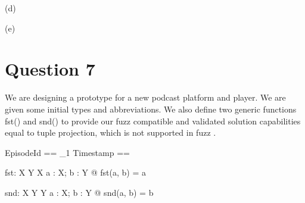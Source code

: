 \documentclass[a4paper,10pt,fleqn]{article}
\begin{document}
\medskip

\noindent\hspace*{\parindent}(d) 

\medskip

\noindent\hspace*{\parindent}(e) 


\bigskip

\setlength{\leftskip}{\dimexpr\parindent+2em\relax}
\newpage

\setlength{\leftskip}{0pt}
\section*{Question 7}

\noindent We are designing a prototype for a new podcast platform and player.  We are given some initial types and abbreviations.  We also define two generic functions fst() and snd() to provide our fuzz compatible and validated solution capabilities equal to tuple projection, which is not supported in fuzz \citep{spivey1993fuzz}. 

\bigskip

\begin{zed}\end{zed}

\begin{zed}
EpisodeId == \nat_1
\also
Timestamp == \nat
\end{zed}

\begin{gendef}[X, Y]
  fst: X \cross Y \fun X
\where
  \forall a : X; b : Y @ fst(a, b) = a
\end{gendef}

\begin{gendef}[X, Y]
  snd: X \cross Y \fun Y
\where
  \forall a : X; b : Y @ snd(a, b) = b
\end{gendef}
\end{document}

